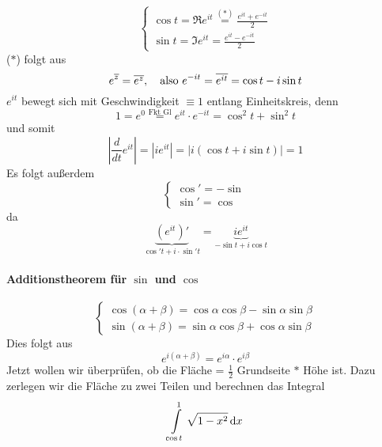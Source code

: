 $$ \begin{cases}
\cos t = \Re e^{it} \overset{(*)}= \frac{e^{it} + e^{-it}}{2}\\
\sin t = \Im e^{it} = \frac{e^{it}-e^{-it}}{2}
\end{cases}$$
($*$) folgt aus
$$
e^{\overline{z}} = \overline{e^z}, \quad \text{also } e^{-it} = \overline{e^{it}} = \cos t - i \sin t
$$
$e^{it}$ bewegt sich mit Geschwindigkeit $\equiv 1$ entlang Einheitskreis, denn
$$1 = e^0 \overset{\text{Fkt Gl}}=e^{it} \cdot e^{-it} = \cos^2 t + \sin^2 t$$
und somit
$$\left|\frac{d}{dt}e^{it}\right| = |ie^{it}| = |i(\cos t + i \sin t)|=1$$
Es folgt außerdem
\begin{equation*}
\begin{cases}
\cos ' = -\sin \\
\sin' = \cos
\end{cases}
\end{equation*}
da
$$
\underbrace{(e^{it})'}_{\cos' t + i\cdot \sin' t} =  \underbrace{i e^{it}}_{-\sin t+ i \cos t}
$$
\paragraph{Additionstheorem für $\sin$ und $\cos$}
\begin{equation*}
\begin{cases}
\cos (\alpha + \beta ) = \cos \alpha \cos \beta - \sin \alpha \sin \beta \\
\sin (\alpha + \beta) = \sin \alpha \cos \beta + \cos \alpha \sin \beta
\end{cases}
\end{equation*}
Dies folgt aus
$$e^{i(\alpha + \beta)} = e^{i\alpha}\cdot e^{i\beta}$$
Jetzt wollen wir überprüfen, ob die Fläche = $\frac{1}{2}$ Grundseite $*$ Höhe ist. Dazu zerlegen wir die Fläche zu zwei Teilen und berechnen das Integral  \Bild
\begin{align*}
\int\limits_{\cos t}^1 \sqrt{1-x^2} \, \mathrm{d} x
\end{align*}
